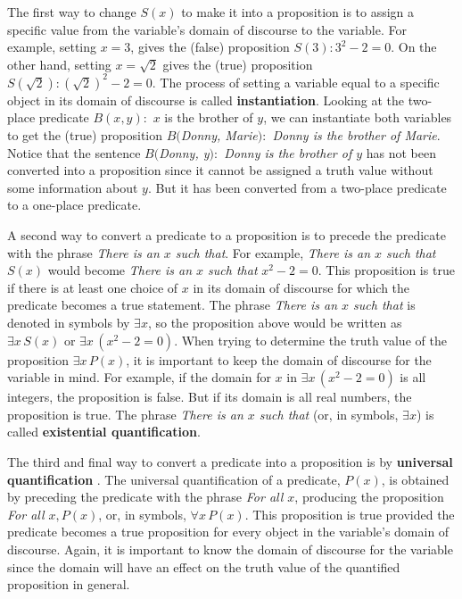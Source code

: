 The first way to change $S(x)$ to make it into a proposition is to assign a 
specific value from the variable's domain of discourse to the variable.
For example, setting $x=3$, gives the (false) proposition $S(3) : 3^2 - 2=0$.
On the other hand, setting $x=\sqrt{2}$ gives the (true) proposition 
$S(\sqrt{2}): (\sqrt{2})^2-2 = 0$. The process of setting a variable equal to a specific
object in its domain of discourse is called {\bfseries instantiation}. Looking at the
two-place predicate $B(x,y) : $ $x$ is the brother of $y$, we can instantiate
both variables to get the (true) proposition {\itshape $B($Donny, Marie$) : 
$ Donny is the brother of Marie}. Notice that the sentence
{\itshape $B($Donny, y$) : $ Donny is the brother of $y$} has not been
converted into a proposition since it cannot be assigned a truth value without some
information about $y$. But it has been converted from a two-place predicate to a
one-place predicate.

A second way to convert a predicate  to a proposition is to precede the predicate
with the phrase {\itshape There is an $x$ such that}.
For example, {\itshape There is an $x$ such that } $S(x)$ would become
 {\itshape There is an $x$ such that } $x^2-2=0$. This proposition is true 
if there is at least one choice of $x$ in its domain of discourse for which
the predicate becomes a true statement. The phrase   {\itshape There is an $x$ such that }
is denoted in symbols by $\exists x$, so the proposition above would be written
as $\exists x\, S(x)$ or $\exists x\, (x^2-2=0)$. When trying to determine the truth
value of the proposition $\exists x\, P(x)$, it is important to keep the domain
of discourse for the variable in mind. For example, if the domain for $x$ in  
 $\exists x\, (x^2-2=0)$ is all integers, the proposition is false. But if its
domain is all real numbers, the proposition is true. The phrase  
{\itshape There is an $x$ such that } (or, in symbols, $\exists x$) is called
 {\bfseries existential quantification}.

The third and final way to convert a predicate into a proposition is by
{\bfseries universal quantification} . The universal quantification of a predicate, $P(x)$,
is obtained  by preceding the predicate with the phrase {\itshape For all $x$}, producing
the proposition {\itshape For all $x, P(x)$}, or, in symbols, $\forall x\, P(x)$. This
proposition is true provided the predicate becomes a true proposition for every object
in the variable's domain of discourse. Again, it is important to know the domain
of discourse for the variable since the domain will have an effect on the truth 
value of the quantified proposition in general. 

